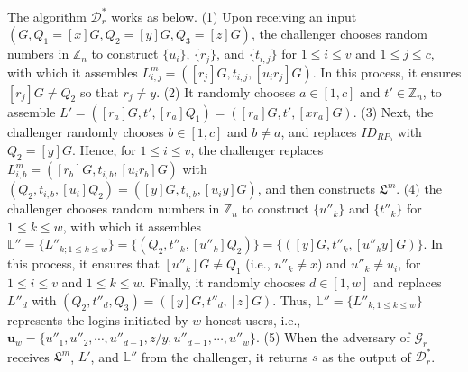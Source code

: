 The algorithm $\mathcal{D}^*_r$ works as below. (1) Upon receiving an input $(G, Q_1=[x]G, Q_2=[y]G, Q_3=[z]G)$, %
the challenger
chooses random numbers in $\mathbb{Z}_n$ to construct $\{u_i\}$, $\{r_j\}$, and $\{t_{i, j}\}$ for $1 \le i \le v$ and $1 \le j \le c$, with which it assembles $L^m_{i, j}=([r_j]G, t_{i,j}, [u_ir_j]G)$.
In this process, it ensures $[r_{j}]G \neq Q_2$ so that $r_j \neq y$.  %
(2) It randomly chooses $a \in [1, c]$ and $t' \in \mathbb{Z}_n$, to assemble $L' = ([r_{a}]G, t', [r_{a}]Q_1) = ([r_{a}]G, t', [xr_{a}]G)$.
(3)
Next, the challenger randomly chooses $b \in [1, c]$ and $b \neq a$, and replaces $ID_{RP_b}$ with $Q_2 = [y]G$.
Hence, for $1 \le i \le v$, the challenger replaces $L^m_{i, b}=([r_b]G, t_{i,b}, [u_ir_b]G)$ with $(Q_2, t_{i,b}, [u_i]Q_2) = ([y]G, t_{i,b}, [u_iy]G)$, and then constructs $\mathfrak{L}^m$.
(4) the challenger chooses random numbers in $\mathbb{Z}_n$ to construct $\{u''_k\}$ and $\{t''_k\}$ for $1 \leq k \leq w$,
 with which it assembles $\mathbb{L}'' = \{L''_{k; 1\leq k \leq w}\} = \{(Q_2, t''_k, [u''_k]Q_2)\} = \{([y]G, t''_k, [u''_ky]G)\}$.
In this process, it ensures that $[u''_k]G \neq Q_1$ (i.e., $u''_k \neq x$) and $u''_k \neq u_i$,
 for $1 \le i \le v$ and $1 \le k \le w$.
Finally, it randomly chooses $d \in [1, w]$ and replaces $L''_{d}$ with $(Q_2, t''_d, Q_3) = ([y]G, t''_d, [z]G)$.
 Thus, $\mathbb{L}'' = \{L''_{k;1\leq k \leq w}\}$ represents the logins initiated by $w$ honest users, i.e., $\mathbf{u}_w=\{u''_1, u''_2, \cdots, u''_{d-1}, z/y, u''_{d+1}, \cdots, u''_w\}$.
 (5) When the adversary of $\mathcal{G}_r$ receives $\mathfrak{L}^m$, $L'$, and $\mathbb{L}''$ from the challenger, it returns $s$ as the output of $\mathcal{D}^*_r$.

